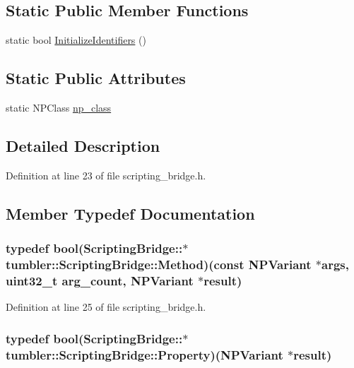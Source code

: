 \subsection*{Static Public Member Functions}
\begin{DoxyCompactItemize}
\item 
static bool \hyperlink{classtumbler_1_1_scripting_bridge_a05f2a65b751d12e6aeaa00bfd91ef83f}{InitializeIdentifiers} ()
\end{DoxyCompactItemize}
\subsection*{Static Public Attributes}
\begin{DoxyCompactItemize}
\item 
static NPClass \hyperlink{classtumbler_1_1_scripting_bridge_a4fcbbbaf7a6d91a2766066fa2cb2236b}{np\_\-class}
\end{DoxyCompactItemize}


\subsection{Detailed Description}


Definition at line 23 of file scripting\_\-bridge.h.



\subsection{Member Typedef Documentation}
\hypertarget{classtumbler_1_1_scripting_bridge_addb1badb0e891b38c6d90767342b5bb3}{
\subsubsection[{Method}]{\setlength{\rightskip}{0pt plus 5cm}typedef bool(ScriptingBridge::$\ast$ {\bf tumbler::ScriptingBridge::Method})(const NPVariant $\ast$args, uint32\_\-t arg\_\-count, NPVariant $\ast$result)}}
\label{classtumbler_1_1_scripting_bridge_addb1badb0e891b38c6d90767342b5bb3}


Definition at line 25 of file scripting\_\-bridge.h.

\hypertarget{classtumbler_1_1_scripting_bridge_ad7507ce0e5c8f49fde790c743447f3c3}{
\subsubsection[{Property}]{\setlength{\rightskip}{0pt plus 5cm}typedef bool(ScriptingBridge::$\ast$ {\bf tumbler::ScriptingBridge::Property})(NPVariant $\ast$result)}}
\label{classtumbler_1_1_scripting_bridge_ad7507ce0e5c8f49fde790c743447f3c3}


